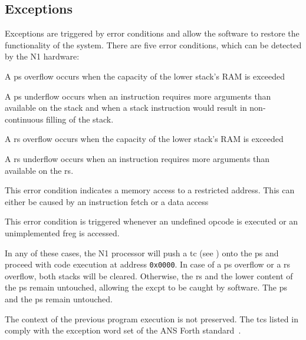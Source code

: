 \subsection{Exceptions}
\label{reset:excpt}
Exceptions are triggered by error conditions and allow the software to restore the functionality
of the system. There are five error conditions, which can be detected by the N1 hardware:
\begin{description}[style=nextline]
\item[\Gls{ps} overflow]
  A \gls{ps} overflow occurs when the capacity of the lower stack's RAM is exceeded
\item[\Gls{rs} stack underflow]
  A \gls{ps} underflow occurs when an instruction requires more arguments than
  available on the \gls{stack} and when a stack instruction would result in non-continuous filling
  of the stack.
\item[\Gls{rs} overflow]
  A \gls{rs} overflow occurs when the capacity of the lower stack's RAM is exceeded
\item[\Gls{rs} underflow]
  A \gls{rs} underflow occurs when an instruction requires more arguments than
  available on the \gls{rs}.
\item[Address out of range]
  This error condition indicates a memory access to a restricted address. This can either
  be caused by an instruction fetch or a data access
\item[Undefined word]
  This error condition is triggered whenever an undefined \gls{opcode} is executed or an
  unimplemented \gls{freg} is accessed.
\end{description}
In any of these cases, the N1 processor will push a \gls{tc} (see ) onto
the \gls{ps} and proceed with code execution at address \texttt{0x0000}.
In case of a \gls{ps} overflow or a \gls{rs} overflow, both stacks will be cleared.
Otherwise, the \gls{rs} and the lower content of the \gls{ps} remain untouched,
allowing the \gls{excpt} to be caught by software. 
The \gls{ps} and the \gls{ps} remain untouched.

The context of the previous program execution is not preserved.
The \glspl{tc} listed in  comply with the exception word set of
the ANS Forth standard~\cite{dpans94}.

